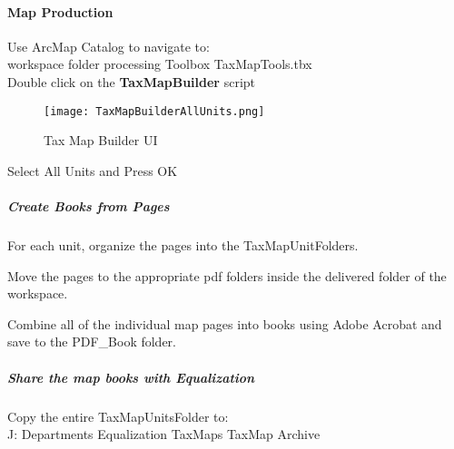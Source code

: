\paragraph{Map Production}

Use ArcMap Catalog to navigate to:\\
workspace folder{\menuArrow} processing {\menuArrow} Toolbox {\menuArrow} TaxMapTools.tbx\\
Double click on the \textbf{TaxMapBuilder} script
\begin{figure}[h!]
 \centering
     \texttt{[image: TaxMapBuilderAllUnits.png]}
 \caption{Tax Map Builder UI}
 \end{figure}

Select All Units and Press OK
\clearpage
\subparagraph{Create Books from Pages}

For each unit, organize the pages into the TaxMapUnitFolders.

\noindent Move the pages to the appropriate pdf folders inside the delivered folder of the workspace. 

\noindent Combine all of the individual map pages into books using Adobe Acrobat and save to the PDF\_Book folder. 
  
\subparagraph{Share the map books with Equalization}

Copy the entire TaxMapUnitsFolder to:\\
J: {\menuArrow} Departments {\menuArrow} Equalization {\menuArrow} TaxMaps {\menuArrow} TaxMap Archive


